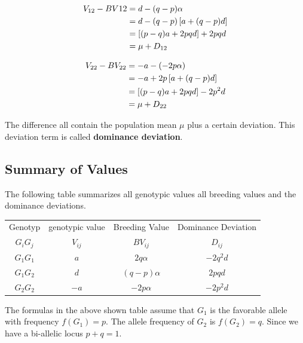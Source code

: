 \documentclass[]{book}
\theoremstyle{definition}
\theoremstyle{definition}
\theoremstyle{definition}
\theoremstyle{remark}
\begin{document}
\begin{align}
  V_{12} - BV{12} &=   d - (q-p)\alpha \notag \\
                   &=   d - (q-p)\left[ a + (q-p)d \right] \notag \\
                   &=   \left[(p-q)a + 2pqd\right] + 2pqd \notag \\
                   &=   \mu + D_{12}
  \end{align}

\begin{align}
  V_{22} - BV_{22} &=   -a - (-2p\alpha) \notag \\
                   &=   -a + 2p\left[ a + (q-p)d \right] \notag \\
                   &=   \left[(p-q)a + 2pqd\right] - 2p^2d \notag \\
                   &=   \mu + D_{22} \notag
  \end{align}

The difference all contain the population mean \(\mu\) plus a certain deviation. This deviation term is called \textbf{dominance deviation}.

\hypertarget{summary-of-values}{%
\subsection{Summary of Values}\label{summary-of-values}}

The following table summarizes all genotypic values all breeding values and the dominance deviations.

\begin{tabular}{|c|c|c|c|}
   \hline
   Genotyp  &  genotypic value     &  Breeding Value    &  Dominance Deviation \\
   $G_iG_j$ &  $V_{ij}$            &  $BV_{ij}$         &  $D_{ij}$           \\
   \hline
   $G_1G_1$ &  $a$                 &  $2q\alpha$        &  $-2q^2d$          \\
   \hline
   $G_1G_2$ &  $d$                 &  $(q-p)\alpha$     & $2pqd$             \\
   \hline
   $G_2G_2$ &  $-a$                &  $-2p\alpha$       & $-2p^2d$           \\
   \hline
\end{tabular}

The formulas in the above shown table assume that \(G_1\) is the favorable allele with frequency \(f(G_1) = p\). The allele frequency of \(G_2\) is \(f(G_2) = q\). Since we have a bi-allelic locus \(p+q=1\).
\end{document}
